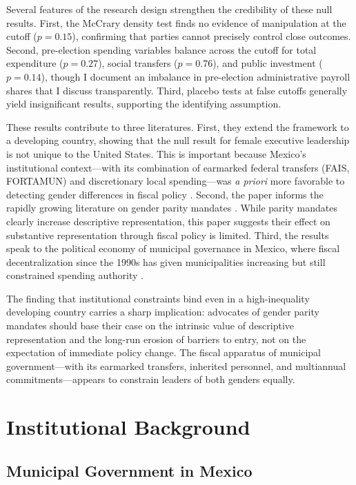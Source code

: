 \documentclass[12pt]{article}
\begin{document}
Several features of the research design strengthen the credibility of these null results. First, the McCrary density test finds no evidence of manipulation at the cutoff ($p=0.15$), confirming that parties cannot precisely control close outcomes. Second, pre-election spending variables balance across the cutoff for total expenditure ($p=0.27$), social transfers ($p=0.76$), and public investment ($p=0.14$), though I document an imbalance in pre-election administrative payroll shares that I discuss transparently. Third, placebo tests at false cutoffs generally yield insignificant results, supporting the identifying assumption.

These results contribute to three literatures. First, they extend the \citet{ferreiragyourko2014} framework to a developing country, showing that the null result for female executive leadership is not unique to the United States. This is important because Mexico's institutional context---with its combination of earmarked federal transfers (FAIS, FORTAMUN) and discretionary local spending---was \textit{a priori} more favorable to detecting gender differences in fiscal policy \citep{diazleal2019}. Second, the paper informs the rapidly growing literature on gender parity mandates \citep{beaman2012, baltrunaite2014, brollo2016}. While parity mandates clearly increase descriptive representation, this paper suggests their effect on substantive representation through fiscal policy is limited. Third, the results speak to the political economy of municipal governance in Mexico, where fiscal decentralization since the 1990s has given municipalities increasing but still constrained spending authority \citep{cabrero2004}.

The finding that institutional constraints bind even in a high-inequality developing country carries a sharp implication: advocates of gender parity mandates should base their case on the intrinsic value of descriptive representation and the long-run erosion of barriers to entry, not on the expectation of immediate policy change. The fiscal apparatus of municipal government---with its earmarked transfers, inherited personnel, and multiannual commitments---appears to constrain leaders of both genders equally.


\section{Institutional Background}

\subsection{Municipal Government in Mexico}
\end{document}
